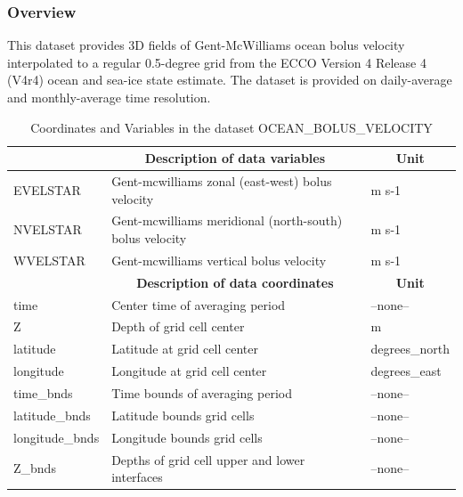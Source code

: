 \subsubsection{Overview}
This dataset provides 3D fields of Gent-McWilliams ocean bolus velocity interpolated to a regular 0.5-degree grid from the ECCO Version 4 Release 4 (V4r4) ocean and sea-ice state estimate. The dataset is provided on daily-average and monthly-average time resolution. 
\begin{longtable}{|m{}|m{}|m{}|}
\caption{Coordinates and Variables in the dataset OCEAN\_BOLUS\_VELOCITY}
\label{tab:table-OCEAN_BOLUS_VELOCITY-fields} \\ 
\hline \endhead \hline \endfoot
\rowcolor{lightgray} \multicolumn{1}{|c|}{\textbf{Variables}} & \multicolumn{1}{|c|}{\textbf{Description of data variables}} &  \multicolumn{1}{|c|}{\textbf{Unit}}\\ \hline
EVELSTAR &Gent-mcwilliams zonal (east-west) bolus velocity &m s-1  \\ \hline
NVELSTAR &Gent-mcwilliams meridional (north-south) bolus velocity &m s-1  \\ \hline
WVELSTAR &Gent-mcwilliams vertical bolus velocity &m s-1  \\ \hline
\rowcolor{lightgray} \multicolumn{1}{|c|}{\textbf{Coordinates}} & \multicolumn{1}{|c|}{\textbf{Description of data coordinates}} &  \multicolumn{1}{|c|}{\textbf{Unit}}\\ \hline
time &Center time of averaging period &--none--  \\ \hline
Z &Depth of grid cell center &m  \\ \hline
latitude &Latitude at grid cell center &degrees\_north  \\ \hline
longitude &Longitude at grid cell center &degrees\_east  \\ \hline
time\_bnds &Time bounds of averaging period &--none--  \\ \hline
latitude\_bnds &Latitude bounds grid cells &--none--  \\ \hline
longitude\_bnds &Longitude bounds grid cells &--none--  \\ \hline
Z\_bnds &Depths of grid cell upper and lower interfaces &--none--  \\ \hline
\end{longtable}

\newp
\pagebreak
